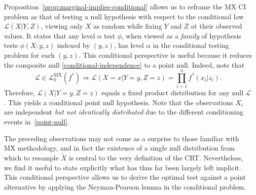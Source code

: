 \documentclass[12pt]{article}
\theoremstyle{definition}
\theoremstyle{remark}
\newcommand{\srx}{X}
\newcommand{\sfx}{x}
\newcommand{\srz}{Z}
\newcommand{\sfz}{z}
\newcommand{\srxk}{\widetilde X}
\newcommand{\sry}{Y}
\newcommand{\sfy}{y}
\begin{document}
Proposition~\ref{prop:marginal-implies-conditional} allows us to reframe the MX CI problem as that of testing a null hypothesis with respect to the conditional law $\mathcal L(\srx|\sry,\srz)$, viewing only $\srx$ as random while fixing $\sry$ and $\srz$ at their observed values. It states that any level $\alpha$ test $\phi$, when viewed as a \textit{family} of hypothesis tests $\phi(\srx; y,z)$ indexed by $(\sfy,\sfz)$, has level $\alpha$ in the conditional testing problem for each $(\sfy, \sfz)$. This conditional perspective is useful because it reduces the composite null \eqref{conditional-independence} to a point null. Indeed, note that 
\begin{equation}
	\mathcal L \in \mathscr L_0^{\text{MX}}(f^*) \Longrightarrow \mathcal L(\srx = \sfx|\sry = \sfy, \srz = \sfz) = \prod_{i = 1}^n  f^*(\sfx_i | \sfz_i).
	\label{point-null}
\end{equation}
Therefore, $\mathcal L(\srx|\sry = \sfy, \srz = \sfz)$ equals a fixed product distribution for any null $\mathcal L$. This yields a conditional point null hypothesis. Note that the observations $\srx_i$ are independent \textit{but not identically distributed} due to the different conditioning events in~\eqref{point-null}.

The preceding observations may not come as a surprise to those familiar with MX methodology, and in fact the existence of a single null distribution from which to resample $\srxk$ is central to the very definition of the CRT. Nevertheless, we find it useful to state explicitly what has thus far been largely left implicit. This conditional perspective allows us to derive the optimal test against a point alternative by applying the  Neyman-Pearson lemma in the conditional problem.
\end{document}
